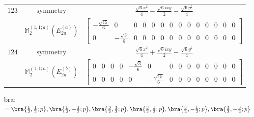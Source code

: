 \documentclass[fleqn,8pt,landscape]{jsarticle}
\begin{document}
\begin{longtable}{ccc}
$ 123 $ & $ \text{symmetry} $ & $ \frac{\sqrt{6} x^{2}}{4} - \frac{\sqrt{6} i x y}{2} - \frac{\sqrt{6} y^{2}}{4} $ \\
$  $ & $ \mathbb{M}_{2}^{(1,1;a)}(E_{2u}^{(a)}) $ & $ \begin{bmatrix} - \frac{\sqrt{15}}{6} & 0 & 0 & 0 & 0 & 0 & 0 & 0 & 0 & 0 & 0 & 0 & 0 & 0 \\ 0 & - \frac{\sqrt{3}}{6} & 0 & 0 & 0 & 0 & 0 & 0 & 0 & 0 & 0 & 0 & 0 & 0 \end{bmatrix} $ \\ \hline
$ 124 $ & $ \text{symmetry} $ & $ \frac{\sqrt{6} x^{2}}{4} + \frac{\sqrt{6} i x y}{2} - \frac{\sqrt{6} y^{2}}{4} $ \\
$  $ & $ \mathbb{M}_{2}^{(1,1;a)}(E_{2u}^{(b)}) $ & $ \begin{bmatrix} 0 & 0 & 0 & 0 & - \frac{\sqrt{3}}{6} & 0 & 0 & 0 & 0 & 0 & 0 & 0 & 0 & 0 \\ 0 & 0 & 0 & 0 & 0 & - \frac{\sqrt{15}}{6} & 0 & 0 & 0 & 0 & 0 & 0 & 0 & 0 \end{bmatrix} $ \\ \hline
\end{longtable}
bra: $=\bra{\frac{1}{2},\frac{1}{2};p}, \bra{\frac{1}{2},- \frac{1}{2};p}, \bra{\frac{3}{2},\frac{3}{2};p}, \bra{\frac{3}{2},\frac{1}{2};p}, \bra{\frac{3}{2},- \frac{1}{2};p}, \bra{\frac{3}{2},- \frac{3}{2};p}$
\end{document}
